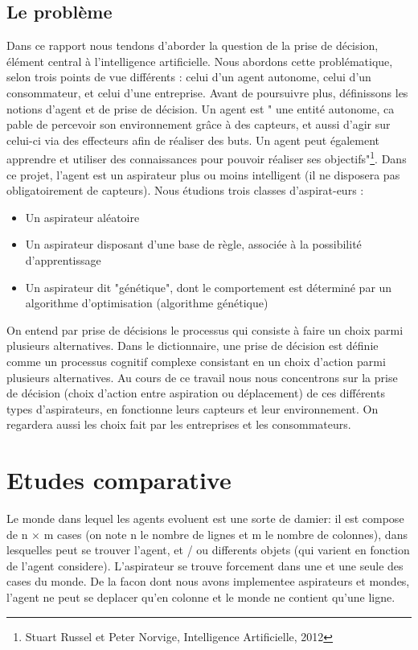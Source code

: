\documentclass[12pt]{article}
\begin{document}
\subsection{Le problème}
\justify
Dans ce rapport nous tendons d'aborder la question de la prise de décision, élément central à l'intelligence artificielle. Nous abordons cette problématique, selon trois points de vue différents : celui d'un agent autonome, celui d'un consommateur, et celui d'une entreprise. 
\justify
Avant de poursuivre plus, définissons les notions d'agent et de prise de décision.
\justify
Un agent est " une entité autonome, ca pable de percevoir son environnement grâce à des capteurs, et aussi d'agir sur celui-ci via des effecteurs afin de réaliser des buts. Un agent peut également apprendre et utiliser des connaissances pour pouvoir réaliser ses objectifs"\footnote{Stuart Russel et Peter Norvige, Intelligence Artificielle, 2012}.
\justify
Dans ce projet, l'agent est un aspirateur plus ou moins intelligent (il ne disposera pas obligatoirement de capteurs). Nous étudions trois classes d'aspirat-eurs : 
\begin{itemize}
\item Un aspirateur aléatoire
\item Un aspirateur disposant d'une base de règle, associée à la possibilité d'apprentissage
\item Un aspirateur dit "génétique", dont le comportement est déterminé par un algorithme d'optimisation (algorithme génétique)
\end{itemize}
On entend par prise de décisions le processus qui consiste à faire un choix parmi plusieurs alternatives.
Dans le dictionnaire, une prise de décision est définie comme un processus cognitif complexe consistant en un choix d'action parmi plusieurs alternatives. 
\justify
Au cours de ce travail nous nous concentrons sur la prise de décision (choix d'action entre aspiration ou déplacement) de ces différents types d'aspirateurs, en fonctionne leurs capteurs et leur environnement. On regardera aussi les choix fait par les entreprises et les consommateurs. 
\section{Etudes comparative}
Le monde dans lequel les agents evoluent est une sorte de damier: il est compose de n $\times$ m cases (on note n le nombre de lignes et m le nombre de colonnes), dans lesquelles peut se trouver l'agent, et / ou differents objets (qui varient en fonction de l'agent considere). L'aspirateur se trouve forcement dans une et une seule des cases du monde.
De la facon dont nous avons implementee aspirateurs et mondes, l'agent ne peut se deplacer qu'en colonne et le monde ne contient qu'une ligne.  
\end{document}
